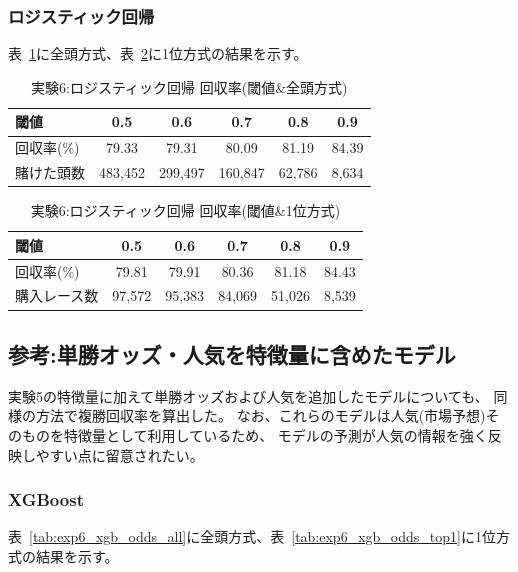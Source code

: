 \documentclass[dvipdfmx, a4paper, 11pt, titlepage]{jsarticle}
\begin{document}
\subsubsection*{ロジスティック回帰}

表~\ref{tab:exp6_logistic_all}に全頭方式、表~\ref{tab:exp6_logistic_top1}に1位方式の結果を示す。


\begin{table}[H]
  \centering
  \caption{実験6:ロジスティック回帰 回収率(閾値\&全頭方式)}
  \label{tab:exp6_logistic_all}
  \begin{tabular}{lccccc}
    \toprule
    閾値 & 0.5 & 0.6 & 0.7 & 0.8 & 0.9 \\
    \midrule
    回収率(\%)   & 79.33 & 79.31 & 80.09 & 81.19 & 84.39 \\
    賭けた頭数   & 483{,}452 & 299{,}497 & 160{,}847 & 62{,}786 & 8{,}634 \\
    \bottomrule
  \end{tabular}
\end{table}

\begin{table}[H]
  \centering
  \caption{実験6:ロジスティック回帰 回収率(閾値\&1位方式)}
  \label{tab:exp6_logistic_top1}
  \begin{tabular}{lccccc}
    \toprule
    閾値 & 0.5 & 0.6 & 0.7 & 0.8 & 0.9 \\
    \midrule
    回収率(\%)     & 79.81 & 79.91 & 80.36 & 81.18 & 84.43 \\
    購入レース数   & 97{,}572 & 95{,}383 & 84{,}069 & 51{,}026 & 8{,}539 \\
    \bottomrule
  \end{tabular}
\end{table}

\subsection{参考:単勝オッズ・人気を特徴量に含めたモデル}

実験5の特徴量に加えて単勝オッズおよび人気を追加したモデルについても、
同様の方法で複勝回収率を算出した。
なお、これらのモデルは人気(市場予想)そのものを特徴量として利用しているため、
モデルの予測が人気の情報を強く反映しやすい点に留意されたい。

\subsubsection{XGBoost}

表~\ref{tab:exp6_xgb_odds_all}に全頭方式、表~\ref{tab:exp6_xgb_odds_top1}に1位方式の結果を示す。
\end{document}
